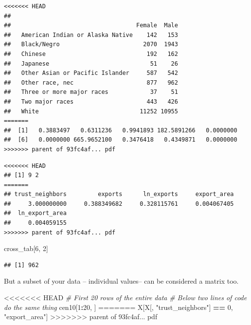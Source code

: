 \documentclass[]{book}
\newenvironment{Shaded}{\begin{snugshade}}{\end{snugshade}}
\newcommand{\CommentTok}[1]{\textcolor[rgb]{0.56,0.35,0.01}{\textit{#1}}}
\newcommand{\DecValTok}[1]{\textcolor[rgb]{0.00,0.00,0.81}{#1}}
\newcommand{\KeywordTok}[1]{\textcolor[rgb]{0.13,0.29,0.53}{\textbf{#1}}}
\newcommand{\NormalTok}[1]{#1}
\newcommand{\OperatorTok}[1]{\textcolor[rgb]{0.81,0.36,0.00}{\textbf{#1}}}
\newcommand{\StringTok}[1]{\textcolor[rgb]{0.31,0.60,0.02}{#1}}
\theoremstyle{definition}
\theoremstyle{definition}
\theoremstyle{definition}
\theoremstyle{remark}
\begin{document}
\begin{Shaded}
\begin{Highlighting}[]
\begin{Shaded}
\begin{Highlighting}[]
\begin{verbatim}
<<<<<<< HEAD
##                                   
##                                    Female  Male
##   American Indian or Alaska Native    142   153
##   Black/Negro                        2070  1943
##   Chinese                             192   162
##   Japanese                             51    26
##   Other Asian or Pacific Islander     587   542
##   Other race, nec                     877   962
##   Three or more major races            37    51
##   Two major races                     443   426
##   White                             11252 10955
=======
##  [1]   0.3883497   0.6311236   0.9941893 182.5891266   0.0000000
##  [6]   0.0000000 665.9652100   0.3476418   0.4349871   0.0000000
>>>>>>> parent of 93fc4af... pdf
\end{verbatim}

\begin{Shaded}
\end{Shaded}

\begin{verbatim}
<<<<<<< HEAD
## [1] 9 2
=======
## trust_neighbors         exports      ln_exports     export_area 
##     3.000000000     0.388349682     0.328115761     0.004067405 
##  ln_export_area 
##     0.004059155
>>>>>>> parent of 93fc4af... pdf
\end{verbatim}

\begin{Shaded}
\begin{Highlighting}[]
\NormalTok{cross\_tab[}\DecValTok{6}\NormalTok{, }\DecValTok{2}\NormalTok{]}
\end{Highlighting}
\end{Shaded}

\begin{verbatim}
## [1] 962
\end{verbatim}

But a subset of your data -- individual values-- can be considered a matrix too.

\begin{Shaded}
\begin{Highlighting}[]
<<<<<<< HEAD
\CommentTok{\# First 20 rows of the entire data}
\CommentTok{\# Below two lines of code do the same thing}
\NormalTok{cen10[}\DecValTok{1}\OperatorTok{:}\DecValTok{20}\NormalTok{, ]}
=======
\NormalTok{X[X[, }\StringTok{"trust_neighbors"}\NormalTok{] }\OperatorTok{==}\StringTok{ }\DecValTok{0}\NormalTok{, }\StringTok{"export_area"}\NormalTok{]}
>>>>>>> parent of 93fc4af... pdf
\end{Highlighting}
\end{Shaded}


\end{Highlighting}
\end{Shaded}
\end{Highlighting}
\end{Shaded}
\end{document}
